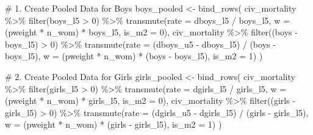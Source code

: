 \documentclass[
  letterpaper,
  DIV=11,
  numbers=noendperiod]{scrartcl}
\newenvironment{Shaded}{\begin{snugshade}}{\end{snugshade}}
\newcommand{\AttributeTok}[1]{\textcolor[rgb]{0.40,0.45,0.13}{#1}}
\newcommand{\CommentTok}[1]{\textcolor[rgb]{0.37,0.37,0.37}{#1}}
\newcommand{\DecValTok}[1]{\textcolor[rgb]{0.68,0.00,0.00}{#1}}
\newcommand{\FunctionTok}[1]{\textcolor[rgb]{0.28,0.35,0.67}{#1}}
\newcommand{\NormalTok}[1]{\textcolor[rgb]{0.00,0.23,0.31}{#1}}
\newcommand{\OtherTok}[1]{\textcolor[rgb]{0.00,0.23,0.31}{#1}}
\newcommand{\SpecialCharTok}[1]{\textcolor[rgb]{0.37,0.37,0.37}{#1}}
\begin{document}
\begin{Shaded}
\begin{Highlighting}[]
\CommentTok{\# 1. Create Pooled Data for Boys}
\NormalTok{boys\_pooled }\OtherTok{\textless{}{-}} \FunctionTok{bind\_rows}\NormalTok{(}
\NormalTok{  civ\_mortality }\SpecialCharTok{\%\textgreater{}\%} 
    \FunctionTok{filter}\NormalTok{(boys\_l5 }\SpecialCharTok{\textgreater{}} \DecValTok{0}\NormalTok{) }\SpecialCharTok{\%\textgreater{}\%} 
    \FunctionTok{transmute}\NormalTok{(}\AttributeTok{rate =}\NormalTok{ dboys\_l5 }\SpecialCharTok{/}\NormalTok{ boys\_l5, }\AttributeTok{w =}\NormalTok{ (pweight }\SpecialCharTok{*}\NormalTok{ n\_wom) }\SpecialCharTok{*}\NormalTok{ boys\_l5, }\AttributeTok{is\_m2 =} \DecValTok{0}\NormalTok{),}
\NormalTok{  civ\_mortality }\SpecialCharTok{\%\textgreater{}\%} 
    \FunctionTok{filter}\NormalTok{((boys }\SpecialCharTok{{-}}\NormalTok{ boys\_l5) }\SpecialCharTok{\textgreater{}} \DecValTok{0}\NormalTok{) }\SpecialCharTok{\%\textgreater{}\%} 
    \FunctionTok{transmute}\NormalTok{(}\AttributeTok{rate =}\NormalTok{ (dboys\_u5 }\SpecialCharTok{{-}}\NormalTok{ dboys\_l5) }\SpecialCharTok{/}\NormalTok{ (boys }\SpecialCharTok{{-}}\NormalTok{ boys\_l5), }\AttributeTok{w =}\NormalTok{ (pweight }\SpecialCharTok{*}\NormalTok{ n\_wom) }\SpecialCharTok{*}\NormalTok{ (boys }\SpecialCharTok{{-}}\NormalTok{ boys\_l5), }\AttributeTok{is\_m2 =} \DecValTok{1}\NormalTok{)}
\NormalTok{)}

\CommentTok{\# 2. Create Pooled Data for Girls}
\NormalTok{girls\_pooled }\OtherTok{\textless{}{-}} \FunctionTok{bind\_rows}\NormalTok{(}
\NormalTok{  civ\_mortality }\SpecialCharTok{\%\textgreater{}\%} 
    \FunctionTok{filter}\NormalTok{(girls\_l5 }\SpecialCharTok{\textgreater{}} \DecValTok{0}\NormalTok{) }\SpecialCharTok{\%\textgreater{}\%} 
    \FunctionTok{transmute}\NormalTok{(}\AttributeTok{rate =}\NormalTok{ dgirls\_l5 }\SpecialCharTok{/}\NormalTok{ girls\_l5, }\AttributeTok{w =}\NormalTok{ (pweight }\SpecialCharTok{*}\NormalTok{ n\_wom) }\SpecialCharTok{*}\NormalTok{ girls\_l5, }\AttributeTok{is\_m2 =} \DecValTok{0}\NormalTok{),}
\NormalTok{  civ\_mortality }\SpecialCharTok{\%\textgreater{}\%} 
    \FunctionTok{filter}\NormalTok{((girls }\SpecialCharTok{{-}}\NormalTok{ girls\_l5) }\SpecialCharTok{\textgreater{}} \DecValTok{0}\NormalTok{) }\SpecialCharTok{\%\textgreater{}\%} 
    \FunctionTok{transmute}\NormalTok{(}\AttributeTok{rate =}\NormalTok{ (dgirls\_u5 }\SpecialCharTok{{-}}\NormalTok{ dgirls\_l5) }\SpecialCharTok{/}\NormalTok{ (girls }\SpecialCharTok{{-}}\NormalTok{ girls\_l5), }\AttributeTok{w =}\NormalTok{ (pweight }\SpecialCharTok{*}\NormalTok{ n\_wom) }\SpecialCharTok{*}\NormalTok{ (girls }\SpecialCharTok{{-}}\NormalTok{ girls\_l5), }\AttributeTok{is\_m2 =} \DecValTok{1}\NormalTok{)}
\NormalTok{)}


\end{Highlighting}
\end{Shaded}
\end{document}
